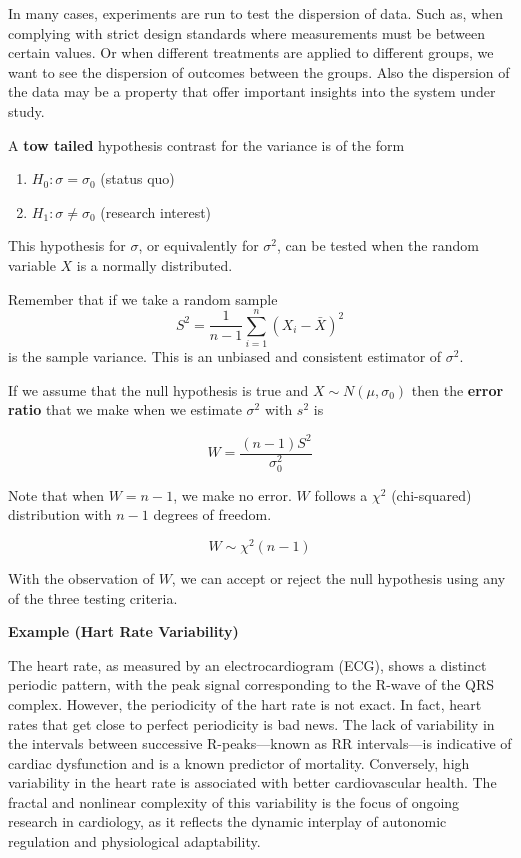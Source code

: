 \documentclass[
]{book}
\providecommand{\tightlist}{%
  \setlength{\itemsep}{0pt}\setlength{\parskip}{0pt}}
\begin{document}
In many cases, experiments are run to test the dispersion of data. Such as, when complying with strict design standards where measurements must be between certain values. Or when different treatments are applied to different groups, we want to see the dispersion of outcomes between the groups. Also the dispersion of the data may be a property that offer important insights into the system under study.

A \textbf{tow tailed} hypothesis contrast for the variance is of the form

\begin{enumerate}
\def\labelenumi{\alph{enumi}.}
\tightlist
\item
  \(H_0:\sigma = \sigma_0\) (status quo)
\item
  \(H_1:\sigma \neq \sigma_0\) (research interest)
\end{enumerate}

This hypothesis for \(\sigma\), or equivalently for \(\sigma^2\), can be tested when the random variable \(X\) is a normally distributed.

Remember that if we take a random sample \[S^2=\frac{1}{n-1}\sum_{i=1}^n (X_i-\bar{X})^2\] is the sample variance. This is an unbiased and consistent estimator of \(\sigma^2\).

If we assume that the null hypothesis is true and \(X \sim N(\mu, \sigma_0)\) then the \textbf{error ratio} that we make when we estimate \(\sigma^2\) with \(s^2\) is

\[W=\frac{(n-1)S^2}{\sigma_0^2}\]

Note that when \(W=n-1\), we make no error. \(W\) follows a \(\chi^2\) (chi-squared) distribution with \(n-1\) degrees of freedom.

\[W \sim \chi^2(n-1)\]

With the observation of \(W\), we can accept or reject the null hypothesis using any of the three testing criteria.

\textbf{Example (Hart Rate Variability)}

The heart rate, as measured by an electrocardiogram (ECG), shows a distinct periodic pattern, with the peak signal corresponding to the R-wave of the QRS complex. However, the periodicity of the hart rate is not exact. In fact, heart rates that get close to perfect periodicity is bad news. The lack of variability in the intervals between successive R-peaks---known as RR intervals---is indicative of cardiac dysfunction and is a known predictor of mortality. Conversely, high variability in the heart rate is associated with better cardiovascular health. The fractal and nonlinear complexity of this variability is the focus of ongoing research in cardiology, as it reflects the dynamic interplay of autonomic regulation and physiological adaptability.
\end{document}
